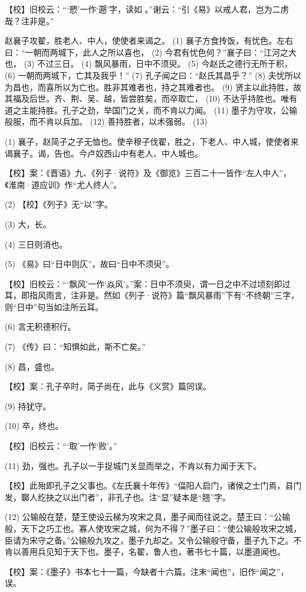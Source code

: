\documentclass[12pt,UTF8]{ctexbook}
\begin{document}
【校】旧校云：“‘愬’一作‘遡’字，读如 。”谢云：“引《易》以戒人君，岂为二虏哉？注非是。”

赵襄子攻翟，胜老人、中人，使使者来谒之。 (1) 襄子方食抟饭，有忧色。左右曰：“一朝而两城下，此人之所以喜也， (2) 今君有忧色何？”襄子曰：“江河之大也， (3) 不过三日。 (4) 飘风暴雨，日中不须臾。 (5) 今赵氏之德行无所于积， (6) 一朝而两城下，亡其及我乎！” (7) 孔子闻之曰：“赵氏其昌乎？” (8) 夫忧所以为昌也，而喜所以为亡也。胜非其难者也，持之其难者也。 (9) 贤主以此持胜，故其福及后世。齐、荆、吴、越，皆尝胜矣，而卒取亡， (10) 不达乎持胜也。唯有道之主能持胜。孔子之劲，举国门之关，而不肯以力闻。 (11) 墨子为守攻，公输般服，而不肯以兵加。 (12) 善持胜者，以术强弱。 (13)

(1) 襄子，赵简子之子无恤也。使辛穆子伐翟，胜之，下老人、中人城，使使者来谒襄子。谒，告也。今卢奴西山中有老人、中人城也。

【校】案：《晋语》九、《列子·说符》及《御览》三百二十一皆作“左人中人”，《淮南·道应训》作“尤人终人”。

(2) 【校】《列子》无“以”字。

(3) 大，长。

(4) 三日则消也。

(5) 《易》曰“日中则仄”，故曰“日中不须臾”。

【校】旧校云：“‘飘风’一作‘焱风’。”案：日中不须臾，谓一日之中不过顷刻即过耳，即指风雨言，注非是。然如《列子·说符》篇“飘风暴雨”下有“不终朝”三字，则“日中”句当如注所云耳。

(6) 言无积德积行。

(7) 《传》曰：“知惧如此，斯不亡矣。”

(8) 昌，盛也。

【校】案：孔子卒时，简子尚在，此与《义赏》篇同误。

(9) 持犹守。

(10) 卒，终也。

【校】旧校云：“‘取’一作‘败’。”

(11) 劲，强也。孔子以一手捉城门关显而举之，不肯以有力闻于天下。

【校】此殆即孔子之父事也。《左氏襄十年传》“偪阳人启门，诸侯之士门焉，县门发，郰人纥抉之以出门者”，非孔子也。注“显”疑本是“翘”字。

(12) 公输般在楚，楚王使设云梯为攻宋之具，墨子闻而往说之。楚王曰：“公输般，天下之巧工也。寡人使攻宋之城，何为不得？”墨子曰：“使公输般攻宋之城，臣请为宋守之备。”公输般九攻之，墨子九却之。又令公输般守备，墨子九下之。不肯以善用兵见知于天下也。墨子，名翟，鲁人也，著书七十篇，以墨道闻也。

【校】案：《墨子》书本七十一篇，今缺者十六篇。注末“闻也”，旧作“闻之”，误。
\end{document}
